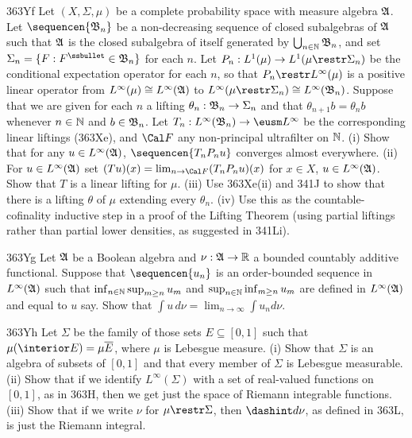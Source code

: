 {\spheader 363Yf 
Let $(X,\Sigma,\mu)$ be a complete probability space
with measure algebra $\frak A$.   Let $\sequencen{\frak B_n}$ be a
non-decreasing sequence of closed subalgebras of $\frak A$ such that
$\frak A$ is the closed subalgebra of itself generated by
$\bigcup_{n\in\Bbb N}\frak B_n$, and set
$\Sigma_n=\{F:F^{\ssbullet}\in\frak B_n\}$ for each $n$.   Let
$P_n:L^1(\mu)\to L^1(\mu\restr\Sigma_n)$ be the conditional expectation
operator for each $n$, so that $P_n\restr L^{\infty}(\mu)$ is a positive
linear operator from $L^{\infty}(\mu)\cong L^{\infty}(\frak A)$ to
$L^{\infty}(\mu\restr\Sigma_n)\cong L^{\infty}(\frak B_n)$.   Suppose
that we are given for each $n$ a lifting $\theta_n:\frak B_n\to\Sigma_n$
and that $\theta_{n+1}b=\theta_nb$ whenever $n\in\Bbb N$ and
$b\in\frak B_n$.
Let $T_n:L^{\infty}(\frak B_n)\to\eusm L^{\infty}$ be the corresponding
linear liftings (363Xe), and $\Cal F$ any non-principal ultrafilter
on $\Bbb N$.   (i) Show that for any $u\in L^{\infty}(\frak A)$,
$\sequencen{T_nP_nu}$ converges almost everywhere.   (ii) For
$u\in L^{\infty}(\frak A)$ set $(Tu)(x)=\lim_{n\to\Cal F}(T_nP_nu)(x)$
for $x\in X$, $u\in L^{\infty}(\frak A)$.   Show that $T$ is a linear
lifting for $\mu$.   (iii) Use 363Xe(ii) and 341J to show that there is a
lifting $\theta$ of $\mu$ extending every $\theta_n$.   (iv) Use this as
the countable-cofinality inductive step in a proof of the Lifting
Theorem (using partial liftings rather than partial lower densities, as
suggested in 341Li).

\spheader 363Yg Let $\frak A$ be a Boolean algebra and
$\nu:\frak A\to\Bbb R$ a
bounded countably additive functional.   Suppose that
$\sequencen{u_n}$ is an order-bounded sequence in
$L^{\infty}(\frak A)$ such that $\inf_{n\in\Bbb N}\sup_{m\ge n}u_m$
and $\sup_{n\in\Bbb N}\inf_{m\ge n}u_m$ are defined in
$L^{\infty}(\frak A)$ and equal to $u$ say.   Show
that $\int u\,d\nu=\lim_{n\to\infty}\int u_nd\nu$.

\spheader 363Yh Let $\Sigma$ be the family of those sets
$E\subseteq[0,1]$ such that $\mu(\interior E)=\mu\overline{E}$, where
$\mu$ is Lebesgue measure.   (i) Show that $\Sigma$ is an algebra of
subsets of $[0,1]$ and that every member of $\Sigma$ is Lebesgue
measurable.   (ii) Show that if we identify $L^{\infty}(\Sigma)$ with a
set of real-valued functions on $[0,1]$, as in 363H, then we get just
the space of Riemann integrable functions.   (iii) Show that if we write
$\nu$ for $\mu\restr\Sigma$, then $\dashint d\nu$, as defined in 363L,
is just the Riemann integral.

}

